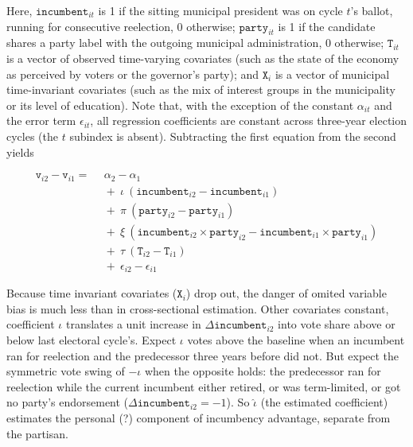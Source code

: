 \documentclass[letter,12pt]{article}
\newcommand{\vn}[1]{\vnform{#1}}      %
\newcommand{\vnform}[1]{\mathtt{#1}}  %
\begin{document}
\noindent Here, $\vn{incumbent}_{it}$ is 1 if the sitting municipal president was on cycle $t$'s ballot, running for consecutive reelection, 0 otherwise; $\vn{party}_{it}$ is 1 if the candidate shares a party label with the outgoing municipal administration, 0 otherwise; $\vn{T}_{it}$ is a vector of observed time-varying covariates (such as the state of the economy as perceived by voters or the governor's party); and $\vn{X}_i$ is a vector of municipal time-invariant covariates (such as the mix of interest groups in the municipality or its level of education). Note that, with the exception of the constant $\alpha_{it}$ and the error term $\epsilon_{it}$, all regression coefficients are constant across three-year election cycles (the $t$ subindex is absent). Subtracting the first equation from the second yields

\begin{equation}
\begin{split}
  \vn{v}_{i2} - \vn{v}_{i1} =  & ~~\alpha_2 - \alpha_1 \\
                               & ~~+~\iota~(\vn{incumbent}_{i2} - \vn{incumbent}_{i1}) \\
                               & ~~+~\pi~(\vn{party}_{i2} - \vn{party}_{i1}) \\
                               & ~~+~\xi~(\vn{incumbent}_{i2} \times \vn{party}_{i2} - \vn{incumbent}_{i1} \times \vn{party}_{i1}) \\
                               & ~~+~\tau~(\vn{T}_{i2} - \vn{T}_{i1}) \\
                               & ~~+~\epsilon_{i2} - \epsilon_{i1}
\end{split}
\end{equation}

\noindent Because time invariant covariates ($\vn{X}_i$) drop out, the danger of omited variable bias is much less than in cross-sectional estimation. Other covariates constant, coefficient $\iota$ translates a unit increase in $\Delta \vn{incumbent}_{i2}$ into vote share above or below last electoral cycle's. Expect $\iota$ votes above the baseline when an incumbent ran for reelection and the predecessor three years before did not. But expect the symmetric vote swing of $-\iota$ when the opposite holds: the predecessor ran for reelection while the current incumbent either retired, or was term-limited, or got no party's endorsement ($\Delta \vn{incumbent}_{i2}=-1$). So $\hat{\iota}$ (the estimated coefficient) estimates the personal (?) component of incumbency advantage, separate from the partisan.
\end{document}
